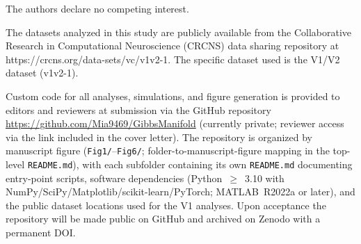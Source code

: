 \documentclass[sn-basic,Numbered]{sn-jnl}%
\theoremstyle{thmstyleone}%
\theoremstyle{thmstyletwo}%
\theoremstyle{thmstylethree}%
\begin{document}
The authors declare no competing interest.

The datasets analyzed in this study are publicly available from the Collaborative Research in Computational Neuroscience (CRCNS) data sharing repository at https://crcns.org/data-sets/vc/v1v2-1. The specific dataset used is the V1/V2 dataset (v1v2-1).


Custom code for all analyses, simulations, and figure generation is provided to editors and reviewers at submission via the GitHub repository \url{https://github.com/Mia9469/GibbsManifold} (currently private; reviewer access via the link included in the cover letter).  The repository is organized by manuscript figure (\texttt{Fig1/}--\texttt{Fig6/}; folder-to-manuscript-figure mapping in the top-level \texttt{README.md}), with each subfolder containing its own \texttt{README.md} documenting entry-point scripts, software dependencies (Python~$\geq$~3.10 with NumPy/SciPy/Matplotlib/scikit-learn/PyTorch; MATLAB~R2022a or later), and the public dataset locations used for the V1 analyses.  Upon acceptance the repository will be made public on GitHub and archived on Zenodo with a permanent DOI.









\end{document}
